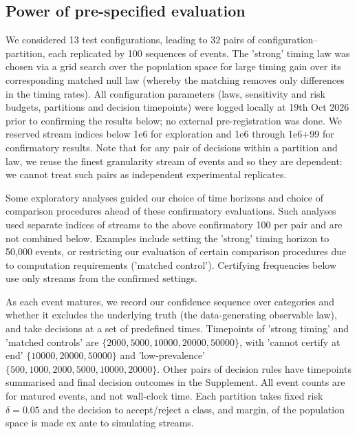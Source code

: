 \subsection{Power of pre-specified evaluation}
We considered 13 test configurations, leading to 32 pairs of configuration--partition, each replicated by 100 sequences of events. The 'strong' timing law was chosen via a grid search over the population space for large timing gain over its corresponding matched null law (whereby the matching removes only differences in the timing rates). All configuration parameters (laws, sensitivity and risk budgets, partitions and decision timepoints) were logged locally at 19th Oct 2026 prior to confirming the results below; no external pre-registration was done. We reserved stream indices below 1e6 for exploration and 1e6 through 1e6+99 for confirmatory results. Note that for any pair of decisions within a partition and law, we reuse the finest granularity stream of events and so they are dependent: we cannot treat such pairs as independent experimental replicates.

Some exploratory analyses guided our choice of time horizons and choice of comparison procedures ahead of these confirmatory evaluations. Such analyses used separate indices of streams to the above confirmatory 100 per pair and are not combined below. Examples include setting the 'strong' timing horizon to 50,000 events, or restricting our evaluation of certain comparison procedures due to computation requirements ('matched control'). Certifying frequencies below use only streams from the confirmed settings.

As each event matures, we record our confidence sequence over categories and whether it excludes the underlying truth (the data-generating observable law), and take decisions at a set of predefined times. Timepoints of 'strong timing' and 'matched controls' are $\{2000,5000,10000,20000,50000\}$, with 'cannot certify at end' $\{10000,20000,50000\}$ and 'low-prevalence' $\{500, 1000, 2000, 5000, 10000, 20000\}$. Other pairs of decision rules have timepoints summarised and final decision outcomes in the Supplement. All event counts are for matured events, and not wall-clock time. Each partition takes fixed risk $\delta=0.05$ and the decision to accept/reject a class, and margin, of the population space is made ex ante to simulating streams.

